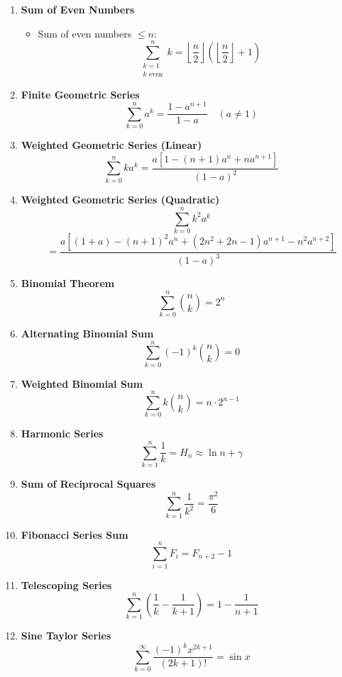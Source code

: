 \documentclass[twoside]{article}
\begin{document}
\begin{multicols*}{2}
\begin{enumerate}[leftmargin=*]
    \item \textbf{Sum of Even Numbers}
        \begin{itemize}
            \item Sum of even numbers $\leq n$:
            \[\sum_{\substack{k = 1 \\ k\text{ even}}}^n k = \left\lfloor \frac{n}{2} \right\rfloor \left( \left\lfloor \frac{n}{2} \right\rfloor + 1 \right)\]
        \end{itemize}
    
    \item \textbf{Finite Geometric Series}
        \[\sum_{k = 0}^n a^k = \frac{1 - a^{n + 1}}{1 - a} \quad (a \neq 1)\]
    
    \item \textbf{Weighted Geometric Series (Linear)}
        \[\sum_{k = 0}^n k a^k = \frac{a[1 - (n + 1)a^n + n a^{n + 1}]}{(1 - a)^2}\]
    
    \item \textbf{Weighted Geometric Series (Quadratic)}
        \[\sum_{k = 0}^n k^2 a^k \]
        \[= \frac{a[(1 + a) - (n + 1)^2 a^n + (2n^2 + 2n - 1)a^{n + 1} - n^2 a^{n + 2}]}{(1 - a)^3}\]
    
    \item \textbf{Binomial Theorem}
        \[\sum_{k=0}^n \binom{n}{k} = 2^n\]
    
    \item \textbf{Alternating Binomial Sum}
        \[\sum_{k=0}^n (-1)^k \binom{n}{k} = 0\]
    
    \item \textbf{Weighted Binomial Sum}
        \[\sum_{k=0}^n k \binom{n}{k} = n \cdot 2^{n-1}\]
    
    \item \textbf{Harmonic Series}
        \[\sum_{k=1}^n \frac{1}{k} = H_n \approx \ln n + \gamma\]
    
    \item \textbf{Sum of Reciprocal Squares}
        \[\sum_{k=1}^n \frac{1}{k^2} = \frac{\pi^2}{6}\]
    
    \item \textbf{Fibonacci Series Sum}
        \[\sum_{i = 1}^{n} F_i = F_{n + 2} - 1\]
    
    \item \textbf{Telescoping Series}
        \[\sum_{k = 1}^{n} \left( \frac{1}{k} - \frac{1}{k + 1} \right) = 1 - \frac{1}{n + 1}\]
    
    \item \textbf{Sine Taylor Series}
        \[\sum_{k = 0}^\infty \frac{(-1)^k x^{2k + 1}}{(2k + 1)!} = \sin x\]
    

\end{enumerate}
\end{multicols*}
\end{document}
